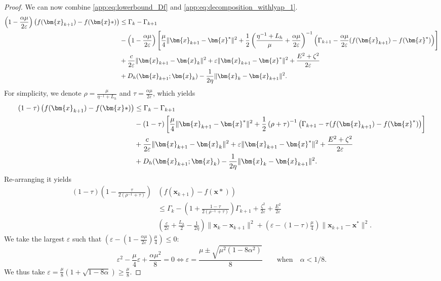\documentclass{article}
\def\eps{{\varepsilon}}
\def\vx{{\bm{x}}}
\theoremstyle{plain}
\theoremstyle{definition}
\theoremstyle{remark}
\begin{document}
\begin{proof}
We can now combine \cref{app:eq:lowerbound_Df} and \cref{app:eq:decomposition_withlyap_1}.
\begin{align*}
    \left(1 - \frac{\alpha \mu}{2 \eps}\right)\left(f(\vx_{k+1}) - f(\vx*)\right) &\le \Gamma_k - \Gamma_{k+1} \\
    &- \left(1 - \frac{\alpha \mu}{2 \eps}\right) \left[\frac{\mu}{4}\|\vx_{k+1}-\vx^*\|^2 +\frac{1}{2}\left(\frac{\eta^{-1} + L_h}{\mu} + \frac{\alpha \mu}{2 \eps}\right)^{-1}  \left(\Gamma_{k+1} - \frac{\alpha \mu}{2 \eps} (f(\vx_{k+1})-f(\vx^*)\right)\right] \notag\\
    & + \frac{c}{2\eps}\|\vx_{k+1} - \vx_k\|^2 + \eps\|\vx_{k+1}-\vx^*\|^2 +  \frac{E^2 + \zeta^2}{2\eps} \notag\\
    & + D_{h}(\vx_{k+1};\vx_k ) - \frac{1}{2\eta}\|\vx_{k} - \vx_{k+1}\|^2. 
\end{align*}
For simplicity, we denote $\rho = \frac{\mu}{\eta^{-1}  + L_h}$ and $\tau = \frac{\alpha \mu}{2 \eps}$, which yields 
\begin{align*}
    \left(1 - \tau\right)\left(f(\vx_{k+1}) - f(\vx*)\right) &\le \Gamma_k - \Gamma_{k+1} \\
    &- \left(1 - \tau\right) \left[\frac{\mu}{4}\|\vx_{k+1}-\vx^*\|^2 +\frac{1}{2}\left(\rho + \tau\right)^{-1}  \left(\Gamma_{k+1} - \tau (f(\vx_{k+1})-f(\vx^*)\right)\right] \notag\\
    & + \frac{c}{2\eps}\|\vx_{k+1} - \vx_k\|^2 + \eps\|\vx_{k+1}-\vx^*\|^2 +  \frac{E^2 + \zeta^2}{2\eps} \notag\\
    & + D_{h}(\vx_{k+1};\vx_k ) - \frac{1}{2\eta}\|\vx_{k} - \vx_{k+1}\|^2. 
\end{align*}
Re-arranging it yields
\begin{align*}
        \left(1 - \tau\right)\left(1 - \frac{\tau}{2(\rho^{-1} + \tau)}\right)&(f(\vx_{k+1}) - f(\vx*)) \\
        &\le \Gamma_k - \left(1 +  \frac{1-\tau}{2(\rho^{-1} + \tau)}\right)\Gamma_{k+1} + \frac{\zeta^2}{2 \eps} + \frac{E^2}{2\eps}\\
        &  \left( \frac{c}{2\eps} + \frac{L_h}{2} - \frac{1}{2\eta} \right)\|\vx_{k} - \vx_{k+1}\|^2 + \left( \eps - \left(1 - \tau\right) \frac{\mu}{4} \right)\|\vx_{k+1}-\vx^*\|^2.
\end{align*}
We take the largest $\eps$ such that  $(\eps - (1-\frac{\alpha \mu}{2\eps})\frac{\mu}{4}) \le 0$:
\[
\eps^2 - \frac{\mu}{4} \eps +\frac{\alpha \mu^2}{8} = 0 \iff \eps = \frac{\mu \pm \sqrt{\mu^2(1-8\alpha^2)}}{8} \qquad \text{when} \quad \alpha < 1/8.
\]
We thus take $\eps = \frac{ \mu}{8}(1 + \sqrt{1 - 8 \alpha}) \ge \frac{\mu}{8}$.


\end{proof}
\end{document}
